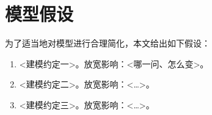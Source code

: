 \section{模型假设}
%

\noindent 为了适当地对模型进行合理简化，本文给出如下假设：

\begin{enumerate}[label=\textbf{假设\chinese{enumi}：}]
  \item <建模约定一>。放宽影响：<哪一问、怎么变>。
  \item <建模约定二>。放宽影响：<…>。
  \item <建模约定三>。放宽影响：<…>。
\end{enumerate}
